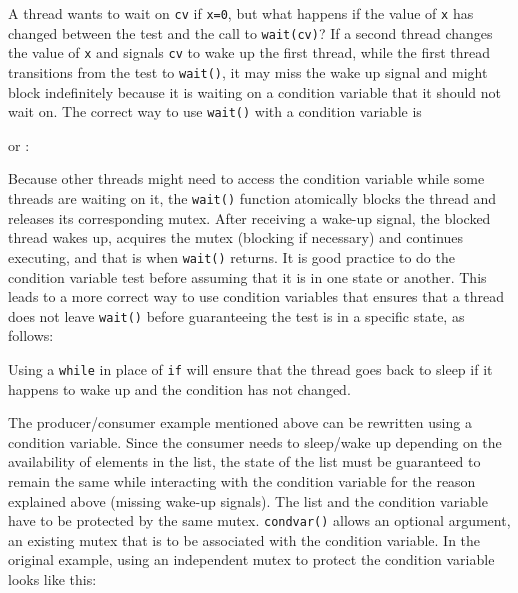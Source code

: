 A thread wants to wait on \texttt{cv} if \texttt{x=0}, but what happens if the
value of \texttt{x} has changed between the test and the call to
\texttt{wait(cv)}?  If a second thread changes the value of \texttt{x} and
signals \texttt{cv} to wake up the first thread, while the first thread
transitions from the test to \texttt{wait()}, it may miss the wake up signal and
might block indefinitely because it is waiting on a condition variable that it
should not wait on.  The correct way to use \texttt{wait()} with a condition
variable is


or :


Because other threads might need to access the condition variable while some
threads are waiting on it, the \texttt{wait()} function atomically blocks the
thread and releases its corresponding mutex.  After receiving a wake-up signal,
the blocked thread wakes up, acquires the mutex (blocking if necessary) and
continues executing, and that is when \texttt{wait()} returns. It is good
practice to do the condition variable test before assuming that it is in one
state or another. This leads to a more correct way to use condition variables
that ensures that a thread does not leave \texttt{wait()} before guaranteeing
the test is in a specific state, as follows:


Using a \texttt{while} in place of \texttt{if} will ensure that the thread goes
back to sleep if it happens to wake up and the condition has not changed.

The producer/consumer example mentioned above can be rewritten using a condition
variable.  Since the consumer needs to sleep/wake up depending on the
availability of elements in the list, the state of the list must be guaranteed
to remain the same while interacting with the condition variable for the reason
explained above (missing wake-up signals). The list and the condition variable
have to be protected by the same mutex.  \texttt{condvar()} allows an optional
argument, an existing mutex that is to be associated with the condition
variable. In the original example, using an independent mutex to protect the
condition variable looks like this:

